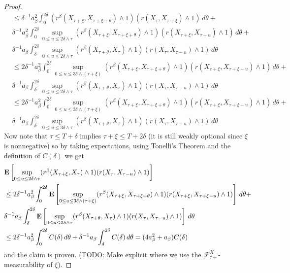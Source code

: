 \begin{proof}
\begin{align*}
&\leq \delta^{-1} a^2_\beta \int_{0}^{2\delta} ( r^\beta(X_{\tau + \xi}, X_{\tau+\xi + \theta}) \wedge 1) (r(X_\tau, X_{\tau+\xi})\wedge 1) \, d\theta + \\
& \delta^{-1} a^2_\beta \int_{0}^{2\delta} \sup_{0 \leq u \leq 2\delta \wedge \tau} ( r^\beta(X_{\tau + \xi}, X_{\tau+\xi + \theta}) \wedge 1) (r(X_{\tau+\xi}, X_{\tau-u})\wedge 1) \, d\theta + \\
& \delta^{-1} a_\beta \int_\delta^{2\delta} \sup_{0 \leq u \leq 2\delta \wedge \tau} (r^\beta(X_{\tau + \theta}, X_{\tau}) \wedge 1)  (r(X_\tau, X_{\tau-u})\wedge 1) \, d\theta \\
&\leq 2 \delta^{-1} a^2_\beta \int_{0}^{2\delta} \sup_{0 \leq u \leq 3\delta \wedge (\tau+\xi)} ( r^\beta(X_{\tau + \xi}, X_{\tau+\xi + \theta}) \wedge 1) (r(X_{\tau+\xi}, X_{\tau+\xi-u})\wedge 1) \, d\theta + \\
& \delta^{-1} a_\beta \int_\delta^{2\delta} \sup_{0 \leq u \leq 2\delta \wedge \tau} (r^\beta(X_{\tau + \theta}, X_{\tau}) \wedge 1)  (r(X_\tau, X_{\tau-u})\wedge 1) \, d\theta \\
&\leq 2 \delta^{-1} a^2_\beta \int_{0}^{2\delta} \sup_{0 \leq u \leq 3\delta \wedge (\tau+\xi)} ( r^\beta(X_{\tau + \xi}, X_{\tau+\xi + \theta}) \wedge 1) (r(X_{\tau+\xi}, X_{\tau+\xi-u})\wedge 1) \, d\theta + \\
& \delta^{-1} a_\beta \int_\delta^{2\delta} \sup_{0 \leq u \leq 3\delta \wedge \tau} (r^\beta(X_{\tau + \theta}, X_{\tau}) \wedge 1)  (r(X_\tau, X_{\tau-u})\wedge 1) \, d\theta 
\end{align*}
Now note that $\tau \leq T + \delta$ implies $\tau+\xi \leq T+2\delta$ (it is still weakly optional since $\xi$ is nonnegative) so by taking expectations, using Tonelli's Theorem and the definition of $C(\delta)$ we get
\begin{align*}
&\textbf{E}\left[\sup_{0 \leq u \leq 2\delta \wedge \tau}  (r^\beta(X_{\tau + \xi}, X_\tau) \wedge 1)(r(X_\tau, X_{\tau-u})\wedge 1) \right]\\
&\leq 2 \delta^{-1} a^2_\beta \int_{0}^{2\delta} \textbf{E}\left[\sup_{0 \leq u \leq 3\delta \wedge (\tau+\xi)} ( r^\beta(X_{\tau + \xi}, X_{\tau+\xi + \theta}) \wedge 1) (r(X_{\tau+\xi}, X_{\tau+\xi-u})\wedge 1)\right] \, d\theta + \\
& \delta^{-1} a_\beta \int_\delta^{2\delta} \textbf{E}\left[\sup_{0 \leq u \leq 3\delta \wedge \tau} (r^\beta(X_{\tau + \theta}, X_{\tau}) \wedge 1)  (r(X_\tau, X_{\tau-u})\wedge 1)\right] \, d\theta \\
&\leq 2 \delta^{-1} a^2_\beta \int_{0}^{2\delta} C(\delta) \, d\theta + \delta^{-1} a_\beta \int_\delta^{2\delta} C(\delta) \, d\theta 
= (4 a^2_\beta + a_\beta) C(\delta)
\end{align*}
and the claim is proven.  (TODO: Make explicit where we use the $\mathcal{F}^X_{\tau+}$-measurability of $\xi$).


\end{proof}
